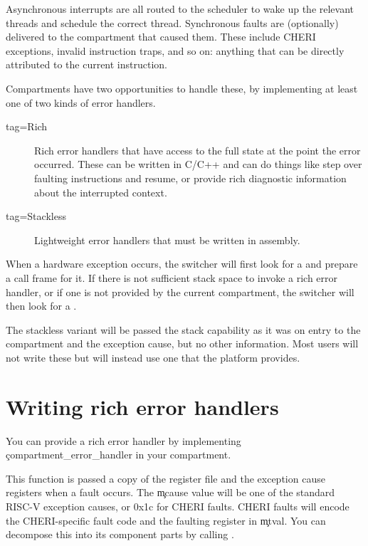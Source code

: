 Asynchronous interrupts are all routed to the scheduler to wake up the relevant threads and schedule the correct thread.
Synchronous faults are (optionally) delivered to the compartment that caused them.
These include CHERI exceptions, invalid instruction traps, and so on: anything that can be directly attributed to the current instruction.

Compartments have two opportunities to handle these, by implementing at least one of two kinds of error handlers.

\begin{description}
	\item[tag=Rich]{Rich error handlers that have access to the full state at the point the error occurred.
		These can be written in C/C++ and can do things like step over faulting instructions and resume, or provide rich diagnostic information about the interrupted context.}
	\item[tag=Stackless]{Lightweight error handlers that must be written in assembly.}
\end{description}

When a hardware exception occurs, the switcher will first look for a  and prepare a call frame for it.
If there is not sufficient stack space to invoke a rich error handler, or if one is not provided by the current compartment, the switcher will then look for a .

The stackless variant will be passed the stack capability as it was on entry to the compartment and the exception cause, but no other information.
Most users will not write these but will instead use one that the platform provides.

\section{Writing rich error handlers}

You can provide a rich error handler by implementing \c{compartment_error_handler} in your compartment.


This function is passed a copy of the register file and the exception cause registers when a fault occurs.
The \c{mcause} value will be one of the standard RISC-V exception causes, or 0x1c for CHERI faults.
CHERI faults will encode the CHERI-specific fault code and the faulting register in \c{mtval}.
You can decompose this into its component parts by calling .

